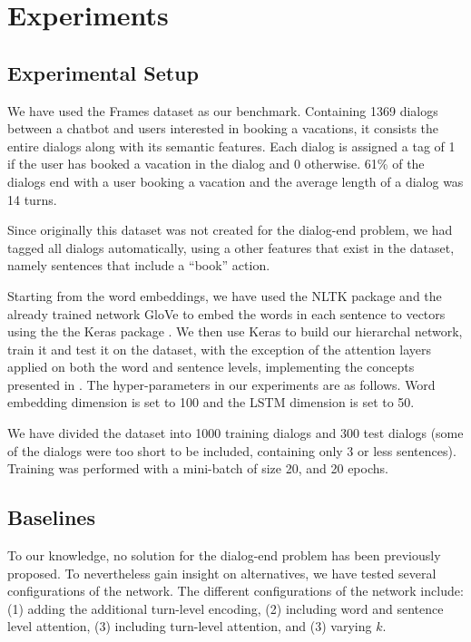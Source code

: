 \section{Experiments}\label{sec:exp}

\subsection{Experimental Setup}
We have used the Frames dataset \cite{frames} as 
our benchmark. Containing 1369 dialogs between 
a chatbot and users interested in booking a vacations, 
it consists the entire dialogs along with its semantic features. 
Each dialog is assigned a tag of 1 if the user has booked a vacation 
in the dialog and 0 otherwise. 61\% of the dialogs end with a user 
booking a vacation and the average length of a dialog was 14 turns. 

Since originally this dataset was not created for the dialog-end problem, 
we had tagged all dialogs automatically, using a other features that exist 
in the dataset, namely sentences that include a ``book'' action. 

Starting from the word embeddings, we have used the 
NLTK package \cite{DBLP:conf/acl/Bird06} and the already trained network GloVe \cite{glove} 
to embed the words in each sentence to vectors using the the Keras package \cite{chollet2015}. 
We then use Keras to build our hierarchal network, train it and test it on the 
dataset, with the exception of the attention layers applied on both the word and sentence 
levels, implementing the concepts presented in \cite{attention,tc}. 
The hyper-parameters in our experiments are as follows. 
Word embedding dimension is set to 100 and the 
LSTM dimension is set to 50. 

We have divided the dataset into 1000 training dialogs and 300 test dialogs 
(some of the dialogs were too short to be included, containing only 3 or less sentences).
Training was performed with a mini-batch of size 20, 
and 20 epochs.

\subsection{Baselines}%
To our knowledge, no solution for the 
dialog-end problem has been previously proposed. To nevertheless
gain insight on alternatives, we have tested several configurations 
of the network. 
The different configurations of the network include: 
(1) adding the additional turn-level encoding, 
(2) including word and sentence level attention, 
(3) including turn-level attention, and 
(3) varying $k$.

